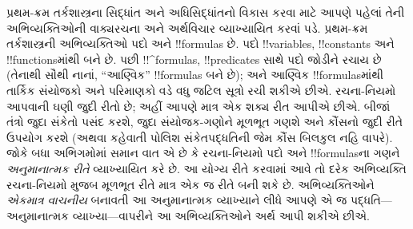 \documentclass[../../../include/open-logic-section]{subfiles}
\begin{document}


પ્રથમ-ક્રમ તર્કશાસ્ત્રના સિદ્ધાંત અને અધિસિદ્ધાંતનો વિકાસ કરવા માટે
આપણે પહેલાં તેની અભિવ્યક્તિઓની વાક્યરચના અને અર્થવિચાર વ્યાખ્યાયિત
કરવાં પડે. પ્રથમ-ક્રમ તર્કશાસ્ત્રની અભિવ્યક્તિઓ પદો અને
!!{formula}s છે. પદો !!{variable}s, !!{constant}s અને !!{function}sમાંથી
બને છે. પછી !!^{formula}s, !!{predicate}s સાથે પદો જોડીને રચાય છે
(તેનાથી સૌથી નાનાં, ``આણ્વિક'' !!{formula}s બને છે); અને આણ્વિક
!!{formula}sમાંથી તાર્કિક સંયોજકો અને પરિમાણકો વડે વધુ જટિલ સૂત્રો
રચી શકીએ છીએ. રચના-નિયમો આપવાની ઘણી જુદી રીતો છે; અહીં આપણે માત્ર
એક શક્ય રીત આપીએ છીએ. બીજાં તંત્રો જુદા સંકેતો પસંદ કરશે, જુદા
સંયોજક-ગણોને મૂળભૂત ગણશે અને કૌંસનો જુદી રીતે ઉપયોગ કરશે (અથવા
કહેવાતી પોલિશ સંકેતપદ્ધતિની જેમ કૌંસ બિલકુલ નહિ વાપરે). જોકે બધા
અભિગમોમાં સમાન વાત એ છે કે રચના-નિયમો પદો અને !!{formula}sના ગણને
\emph{અનુમાનાત્મક રીતે} વ્યાખ્યાયિત કરે છે. આ યોગ્ય રીતે કરવામાં આવે
તો દરેક અભિવ્યક્તિ રચના-નિયમો મુજબ મૂળભૂત રીતે માત્ર એક જ રીતે બની
શકે છે. અભિવ્યક્તિઓને \emph{એકમાત્ર વાચનીય} બનાવતી આ
અનુમાનાત્મક વ્યાખ્યાને લીધે આપણે એ જ પદ્ધતિ---અનુમાનાત્મક
વ્યાખ્યા---વાપરીને આ અભિવ્યક્તિઓને અર્થ આપી શકીએ છીએ.
\end{document}
